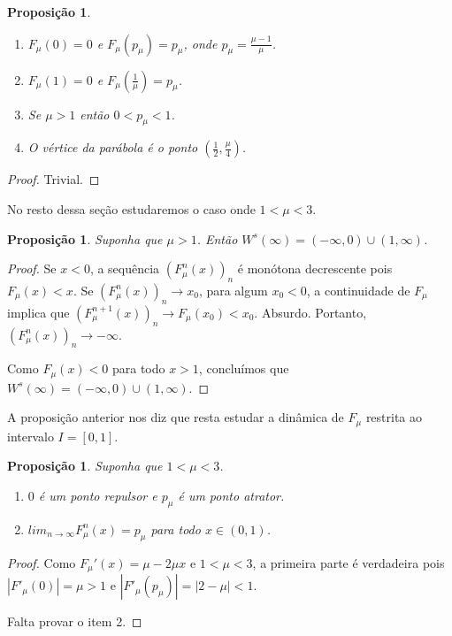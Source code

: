 \documentclass[a4paper, 12pt]{article}
\theoremstyle{definition}
\theoremstyle{plain}
\newtheorem{proposition}[definition]{Proposição}
\theoremstyle{plain}
\theoremstyle{plain}
\theoremstyle{remark}
\begin{document}
\begin{proposition}
\begin{enumerate}
\item $F_\mu (0) = 0$ e $F_\mu(p_\mu) = p_\mu$, onde $p_\mu = \frac{\mu - 1}{\mu}$.
\item $F_\mu (1) = 0$ e $F_\mu(\frac{1}{\mu}) = p_\mu$.
\item Se $\mu > 1$ então $0 < p_\mu < 1$.
\item O vértice da parábola é o ponto $(\frac{1}{2}, \frac{\mu}{4})$.
\end{enumerate}
\end{proposition}

\begin{proof}
Trivial.
\end{proof}

No resto dessa seção estudaremos o caso onde $1 < \mu < 3$.

\begin{proposition}
\label{conjunto estavel infinito}
Suponha que $\mu > 1$. Então $W^s(\infty) = (-\infty, 0) \cup (1, \infty)$.
\end{proposition}

\begin{proof}
Se $x < 0$, a sequência  $(F^n _\mu (x))_n$ é monótona decrescente pois  $F_\mu (x) < x$. Se $(F^n_{\mu}(x))_n \rightarrow x_0$, para algum $x_0 < 0$, a continuidade de $F_\mu$ implica que $(F^{n+1}_{\mu}(x))_n \rightarrow F_\mu (x_0) < x_0$. Absurdo. Portanto, $(F^n_{\mu}(x))_n \rightarrow -\infty$.

Como $F_\mu (x) < 0$ para todo $x > 1$, concluímos que $W^s(\infty) = (-\infty, 0) \cup (1, \infty)$.
\end{proof}

A proposição anterior nos diz que resta estudar a dinâmica de $F_\mu$ restrita ao intervalo $I = [0, 1]$.

\begin{proposition}
Suponha que $1 < \mu < 3$.
\begin{enumerate}
\item $0$ é um ponto repulsor e $p_\mu$ é um ponto atrator.
\item $lim_{n \rightarrow \infty} F^n_{\mu}(x) = p_\mu$ para todo $x \in (0, 1)$.
\end{enumerate}
\end{proposition}

\begin{proof}
Como $F_\mu '(x) = \mu - 2\mu x$ e $1 < \mu < 3$, a primeira parte é verdadeira pois $|F'_\mu(0)| = \mu > 1$ e $|F'_\mu (p_\mu)| = |2 - \mu| < 1$.

Falta provar o item 2.
\end{proof}
\end{document}

